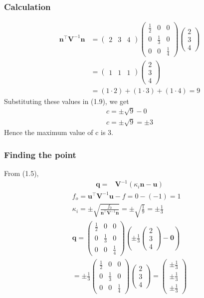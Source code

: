 \documentclass{beamer}
\providecommand{\brak}[1]{\ensuremath{\left(#1\right)}}
\theoremstyle{remark}
\newcommand{\myvec}[1]{\ensuremath{\begin{pmatrix}#1\end{pmatrix}}}
\let\vec\mathbf
\numberwithin{equation}{section}
\begin{document}
\begin{frame}
\frametitle{Calculation}
 \begin{align}
     \vec{n}^\top \mathbf{V}^{-1} \vec{n} &= \myvec{2 & 3 & 4} \myvec{ \frac{1}{2} & 0 & 0 \\ 0 & \frac{1}{3} & 0 \\ 0 & 0 & \frac{1}{4} } \myvec{2 \\ 3 \\ 4} \\
     &= \myvec{1 & 1 &1}\myvec{2\\3\\4} \\
     &=  (1 \cdot 2) + (1 \cdot 3) + (1 \cdot 4) = 9
 \end{align}
 Substituting these values in (1.9), we get
 \begin{align}
c = \pm \sqrt{9}-0\\
c = \pm \sqrt{9} = \pm 3
 \end{align}
 Hence the maximum value of c is 3.
 \end{frame}

\begin{frame}
\frametitle{Finding the point}
From (1.5),
 \begin{align}
    \vec{q} = &\vec{V}^{-1}(\kappa_{i} \vec{n} - \vec{u}) 
 \end{align}
 \begin{align}
 f_{o} = \vec{u}^\top\vec{V}^{-1}\vec{u} - f = 0 - (-1) = 1 \\
     \kappa_{i} = 
    \pm\sqrt{\frac{f_0}{\vec{n}^\top\vec{V}^{-1}\vec{n}}}=\pm \sqrt{\frac{1}{9}}=\pm\frac{1}{3} \\
    \vec{q} = \myvec{ \frac{1}{2} & 0 & 0 \\ 0 & \frac{1}{3} & 0 \\ 0 & 0 & \frac{1}{4} }\brak{\pm\frac{1}{3} \myvec{2 \\ 3\\ 4 } - \vec{0}}  \\
    = \pm\frac{1}{3}\myvec{ \frac{1}{2} & 0 & 0 \\ 0 & \frac{1}{3} & 0 \\ 0 & 0 & \frac{1}{4} } \myvec{2 \\ 3\\ 4 } = \myvec{ \pm\frac{1}{3} \\ \pm\frac{1}{3} \\ \pm\frac{1}{3}   }
 \end{align}
 
 \end{frame}
\end{document}
